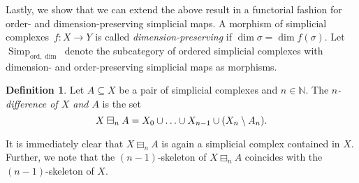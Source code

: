 \documentclass[oneside]{amsart}
\theoremstyle{definition}
\newtheorem{definition}[theorem]{Definition}
\newcommand\ord{\mathrm{ord}}
\newcommand\Simp{\operatorname{Simp}}
\begin{document}
Lastly, we show that we can extend the above result in a functorial fashion for order- and dimension-preserving simplicial maps.
A morphism of simplicial complexes~$f \colon X \to Y$ is called \emph{dimension-preserving} if $\dim \sigma = \dim f(\sigma)$.
Let $\Simp_{\ord, \dim}$ denote the subcategory of ordered simplicial complexes with dimension- and order-preserving simplicial maps as morphisms.

\begin{definition}
    Let $A \subseteq X$ be a pair of simplicial complexes and $n \in \mathbb N$.
    The \emph{$n$-difference of $X$ and $A$} is the set
    \[ X \boxminus_n A = X_0 \cup \dotsc \cup X_{n-1} \cup (X_n \setminus A_n) \text. \]
\end{definition}

It is immediately clear that $X \boxminus_n A$ is again a simplicial complex contained in $X$.
Further, we note that the $(n-1)$-skeleton of $X \boxminus_n A$ coincides with the $(n-1)$-skeleton of $X$.
\end{document}
